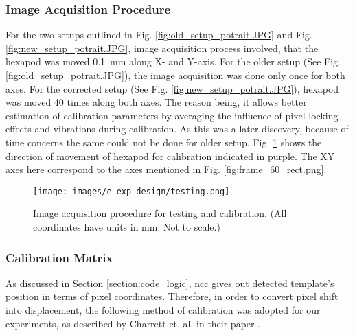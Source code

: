     \subsubsection*{Image Acquisition Procedure}\label{subsection:image_acq_calib}
        For the two setups outlined in Fig. \ref{fig:old_setup_potrait.JPG} and Fig. \ref{fig:new_setup_potrait.JPG}, image acquisition process involved, that the hexapod was moved \SI{0.1}{\milli\meter} along X- and Y-axis. For the older setup (See Fig. \ref{fig:old_setup_potrait.JPG}), the image acquisition was done only once for both axes. For the corrected setup (See Fig. \ref{fig:new_setup_potrait.JPG}), hexapod was moved 40 times along both axes. The reason being, it allows better estimation of calibration parameters by averaging the influence of pixel-locking effects and vibrations during calibration. As this was a later discovery, because of time concerns the same could not be done for older setup. Fig. \ref{fig:testing.png} shows the direction of movement of hexapod for calibration indicated in purple. The XY axes here correspond to the axes mentioned in Fig. \ref{fig:frame_60_rect.png}.

        \begin{figure}[h]
            \centering
            \texttt{[image: images/e\_exp\_design/testing.png]}
            \caption{Image acquisition procedure for testing and calibration. (All coordinates have units in mm. Not to scale.)}
            \label{fig:testing.png}
        \end{figure}


    \subsubsection*{Calibration Matrix}\label{subsection:calib_matrix}
        As discussed in Section \ref{section:code_logic}, \gls{ncc} gives out detected template's position in terms of pixel coordinates. Therefore, in order to convert pixel shift into displacement, the following method of calibration was adopted for our experiments, as described by Charrett et. al. in their paper \cite{charrett_2018}.

        \vspace{5mm}

